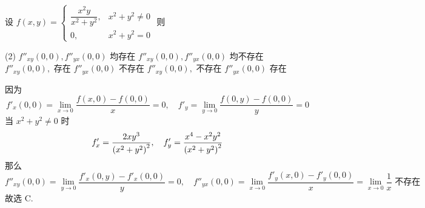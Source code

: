 \begin{example}
    设 $f(x,y)=\begin{cases}
            \dfrac{x^2y}{x^2+y^2}, & x^2+y^2\neq 0 \\
            0,                     & x^2+y^2=0
        \end{cases}$ 则
    \begin{tasks}(2)
        \task $f''_{xy}(0,0), f''_{yx}(0,0)$ 均存在
        \task $f''_{xy}(0,0), f''_{yx}(0,0)$ 均不存在
        \task $f''_{xy}(0,0), $ 存在 $ f''_{yx}(0,0)$ 不存在
        \task $f''_{xy}(0,0), $ 不存在 $ f''_{yx}(0,0)$ 存在
    \end{tasks}
\end{example}
\begin{solution}
    因为 $$
        f'_x(0,0)=\lim_{x \to 0}\dfrac{f(x,0)-f(0,0)}{x}=0,\quad f'_y=\lim_{y \to 0}\dfrac{f(0,y)-f(0,0)}{y}=0
    $$
    当 $x^2+y^2\neq 0$ 时
    $$
        f'_x=\dfrac{2xy^3}{\qty(x^2+y^2)^2},\quad f'_y=\dfrac{x^4-x^2y^2}{\qty(x^2+y^2)^2}
    $$
    那么 $$
        f''_{xy}(0,0)=\lim_{y \to 0}\dfrac{f'_x(0,y)-f'_x(0,0)}{y}=0,\quad f''_{yx}(0,0)=\lim_{x \to 0}\dfrac{f'_y(x,0)-f'_y(0,0)}{x}=\lim_{x \to 0}\dfrac{1}{x}\text{ 不存在}
    $$
    故选 C.
\end{solution}

